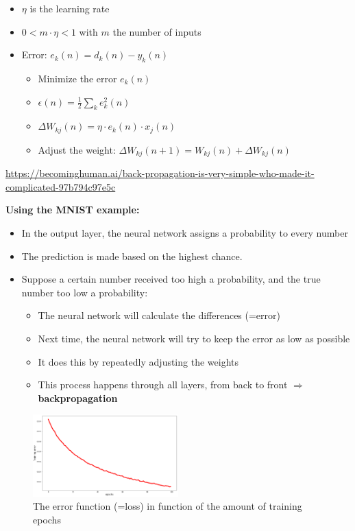\documentclass{article}
\begin{document}
\begin{itemize}
    \item $\eta$ is the learning rate
    \item $0 < m \cdot \eta < 1$ with $m$ the number of inputs
    \item Error: $e_k(n) = d_k(n) - y_k(n)$
    \begin{itemize}
        \item Minimize the error $e_k(n)$
        \item $\epsilon(n) = \frac12 \sum_k e^2_k(n)$
        \item $\Delta W_{kj}(n) = \eta \cdot e_k(n) \cdot x_j(n)$
        \item Adjust the weight: $\Delta W_{kj}(n+1) = W_{kj}(n) + \Delta W_{kj}(n)$
    \end{itemize}
\end{itemize}

\url{https://becominghuman.ai/back-propagation-is-very-simple-who-made-it-complicated-97b794c97e5c}

\textbf{Using the MNIST example:}

\begin{itemize}
    \item In the output layer, the neural network assigns a probability to every number
    \item The prediction is made based on the highest chance.
    \item Suppose a certain number received too high a probability, and the true number too low a probability:
    \begin{itemize}
        \item The neural network will calculate the differences (=error)
        \item Next time, the neural network will try to keep the error as low as possible
        \item It does this by repeatedly adjusting the weights
        \item This process happens through all layers, from back to front $\Rightarrow$ \textbf{backpropagation}
    \end{itemize}
\end{itemize}

\begin{figure}[H]
    \centering
    \includegraphics[width=0.5\textwidth]{backpropagation-error.png}
    \caption{The error function (=loss) in function of the amount of training epochs}
\end{figure}
\end{document}
